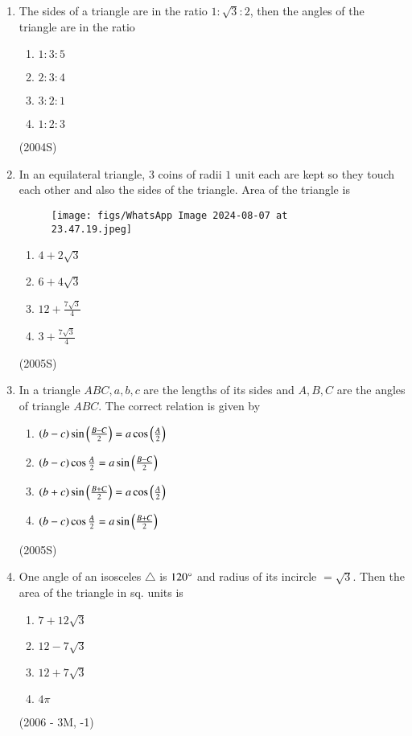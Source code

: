 \documentclass[journal,12pt,twocolumn]{IEEEtran}
\theoremstyle{remark}
\begin{document}
\begin{enumerate}
\item The sides of a triangle are in the ratio $1:\sqrt{3}:2$, then the angles of the triangle are in the ratio
\begin{enumerate}[label = (\alph*)]
\item $1:3:5$
\item $2:3:4$
\item $3:2:1$
\item $1:2:3$
\end{enumerate}
\hfill (2004S)\\

\item In an equilateral triangle, $3$ coins of radii $1$ unit each are kept so they touch each other and also the sides of the triangle. Area of the triangle is 
\begin{figure}
    \centering
    \texttt{[image: figs/WhatsApp Image 2024-08-07 at 23.47.19.jpeg]}
    \label{fig:enter-label}
\end{figure}
\begin{enumerate}[label = (\alph*)]
\item $4+2\sqrt{3}$
\item $6+4\sqrt{3}$
\item $12+\frac{7\sqrt{3}}{4}$
\item $3+\frac{7\sqrt{3}}{4}$
\end{enumerate}
\hfill (2005S)\\

\item In a triangle $ABC, a, b, c$  are the lengths of its sides and $A, B, C$ are the angles of triangle $ABC$. The correct relation is given by
\begin{enumerate}[label = (\alph*)]
\item $(b-c)\sin \left(\frac{B-C}{2}\right) = a \cos \left(\frac{A}{2}\right)$
\item $(b-c) \cos \frac{A}{2} = a \sin \left(\frac{B-C}{2}\right)$
\item $(b+c)\sin \left(\frac{B+C}{2}\right) = a \cos \left(\frac{A}{2}\right)$
\item $(b-c) \cos \frac{A}{2} = a \sin \left(\frac{B+C}{2}\right)$
\end{enumerate}
\hfill (2005S)\\

\item One angle of an isosceles $\triangle$ is $120\degree$ and radius of its incircle $= \sqrt{3}$. Then the area of the triangle in sq. units is 
\begin{enumerate}[label = (\alph*)]
\item $7+12\sqrt{3}$
\item $12-7\sqrt{3}$
\item $12+7\sqrt{3}$
\item $4\pi$
\end{enumerate}
\hfill (2006 - 3M, -1)\\


\end{enumerate}
\end{document}
